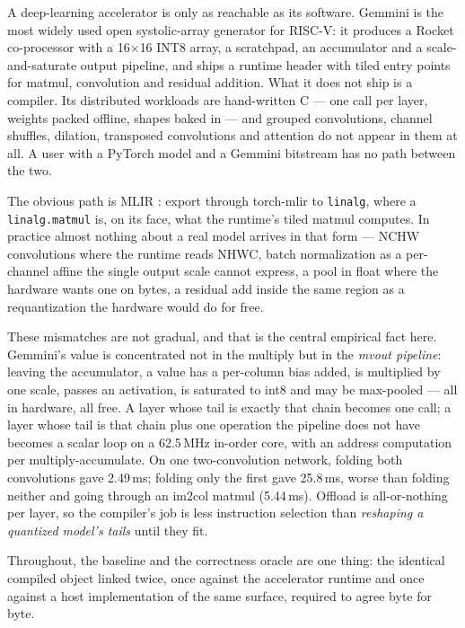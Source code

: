 \documentclass[runningheads]{llncs}
\begin{document}
A deep-learning accelerator is only as reachable as its software. Gemmini
\cite{gemmini} is the most widely used open systolic-array generator for RISC-V:
it produces a Rocket \cite{rocket} co-processor with a 16$\times$16 INT8 array, a
scratchpad, an accumulator and a scale-and-saturate output pipeline, and ships a
runtime header with tiled entry points for matmul, convolution and residual
addition. What it does not ship is a compiler. Its distributed workloads are
hand-written C --- one call per layer, weights packed offline, shapes baked in ---
and grouped convolutions, channel shuffles, dilation, transposed convolutions and
attention do not appear in them at all. A user with a PyTorch model and a Gemmini
bitstream has no path between the two.

The obvious path is MLIR \cite{mlir}: export through torch-mlir \cite{torchmlir}
to \texttt{linalg}, where a \texttt{linalg.matmul} is, on its face, what the
runtime's tiled matmul computes. In practice almost nothing about a real model
arrives in that form --- NCHW convolutions where the runtime reads NHWC, batch
normalization as a per-channel affine the single output scale cannot express, a
pool in float where the hardware wants one on bytes, a residual add inside the
same region as a requantization the hardware would do for free.

These mismatches are not gradual, and that is the central empirical fact here.
Gemmini's value is concentrated not in the multiply but in the \emph{mvout
pipeline}: leaving the accumulator, a value has a per-column bias added, is
multiplied by one scale, passes an activation, is saturated to int8 and may be
max-pooled --- all in hardware, all free. A layer whose tail is exactly that chain
becomes one call; a layer whose tail is that chain plus one operation the pipeline
does not have becomes a scalar loop on a 62.5\,MHz in-order core, with an address
computation per multiply-accumulate. On one two-convolution network, folding both
convolutions gave 2.49\,ms; folding only the first gave 25.8\,ms, worse than
folding neither and going through an im2col matmul (5.44\,ms). Offload is
all-or-nothing per layer, so the compiler's job is less instruction selection than
\emph{reshaping a quantized model's tails} until they fit.

Throughout, the baseline and the correctness oracle are one thing: the identical
compiled object linked twice, once against the accelerator runtime and once
against a host implementation of the same surface, required to agree byte for
byte.
\end{document}
